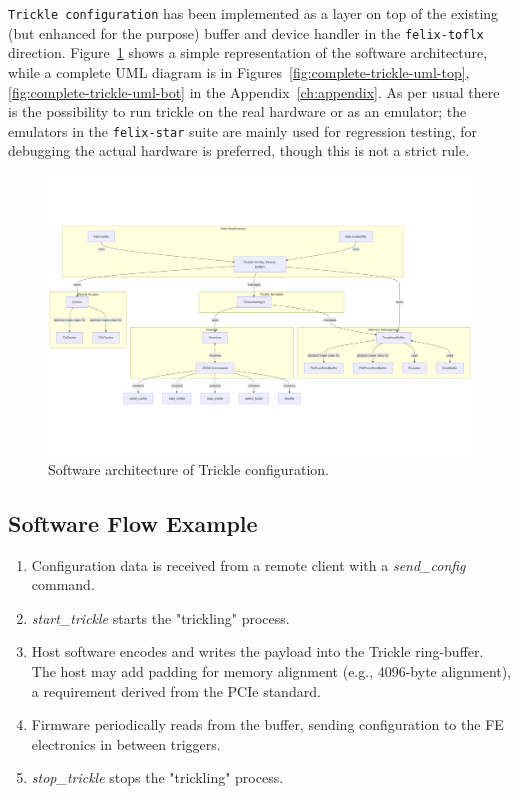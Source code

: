 \texttt{Trickle configuration} \cite{felix-star-trickle-configuration} has been implemented as a layer on top of the existing (but enhanced for the purpose) buffer and device handler in the \texttt{felix-toflx} direction. Figure~\ref{fig:trickle-software-architecture} shows a simple representation of the software architecture, while a complete UML diagram is in Figures~\ref{fig:complete-trickle-uml-top}, \ref{fig:complete-trickle-uml-bot} in the Appendix~\ref{ch:appendix}. As per usual there is the possibility to run trickle on the real hardware or as an emulator; the emulators in the \texttt{felix-star} suite are mainly used for regression testing, for debugging the actual hardware is preferred, though this is not a strict rule.

\begin{figure}
\centering
\includegraphics[width=\textwidth]{images/contributions/trickle-architecture.png}
\caption{Software architecture of Trickle configuration.}
\label{fig:trickle-software-architecture}
\end{figure}

\subsection{Software Flow Example}
\begin{enumerate}
    \item Configuration data is received from a remote client with a \textit{send\_config} command.
    \item \textit{start\_trickle} starts the "trickling" process.
    \item Host software encodes and writes the payload into the Trickle ring-buffer. The host may add padding for memory alignment (e.g., 4096-byte alignment), a requirement derived from the \acs{PCIe} standard.
    \item Firmware periodically reads from the buffer, sending configuration to the \acs{FE} electronics in between triggers.
    \item \textit{stop\_trickle} stops the "trickling" process.
\end{enumerate}


